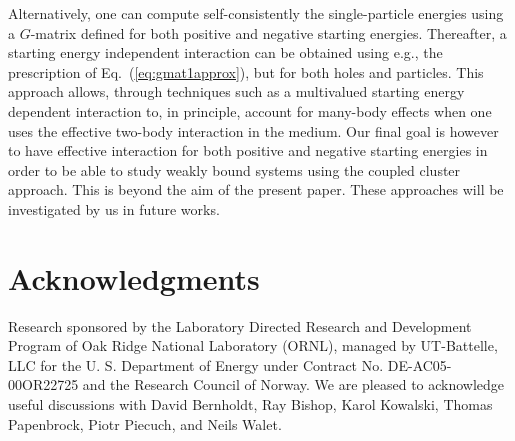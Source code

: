 \documentclass[aps,prc,twocolumn,floatfix]{revtex4}
\begin{document}
Alternatively, one can compute
self-consistently the single-particle energies using a $G$-matrix 
defined for both positive and negative starting energies. 
Thereafter, a starting energy independent
interaction can be obtained using e.g., the prescription of 
Eq.~(\ref{eq:gmat1approx}), but for both holes
and particles. This approach allows, 
through techniques such as a multivalued starting energy
dependent interaction to, in principle, account for many-body 
effects when one uses the effective two-body interaction in the
medium.
Our final goal is however to have effective interaction for both positive and 
negative starting energies in order to be able to study weakly bound
systems using the coupled cluster approach. This is beyond the 
aim of the present paper. These approaches will be investigated by us
in future works.  

\section*{Acknowledgments}
Research sponsored by the Laboratory Directed Research and Development
Program of Oak Ridge National Laboratory (ORNL), managed by
UT-Battelle, LLC for the U. S.  Department of Energy under
Contract No. DE-AC05-00OR22725 and the Research Council of Norway. 
We are pleased to acknowledge useful discussions with David Bernholdt,
Ray Bishop, Karol Kowalski, Thomas Papenbrock, Piotr Piecuch, 
and Neils Walet.
\end{document}

